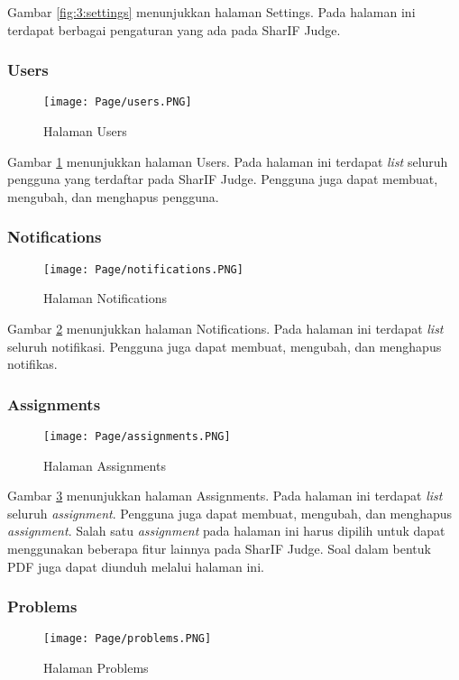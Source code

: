     Gambar \ref{fig:3:settings} menunjukkan halaman Settings. Pada halaman ini terdapat berbagai pengaturan yang ada pada SharIF Judge.
    
\subsubsection{Users}
    \begin{figure}[H]
    	\centering  
    	\texttt{[image: Page/users.PNG]}  
    	\caption{Halaman Users}
    	\label{fig:3:users} 
    \end{figure} 
    
    Gambar \ref{fig:3:users} menunjukkan halaman Users. Pada halaman ini terdapat \textit{list} seluruh pengguna yang terdaftar pada SharIF Judge. Pengguna juga dapat membuat, mengubah, dan menghapus pengguna.
    
\subsubsection{Notifications}
    \begin{figure}[H]
    	\centering  
    	\texttt{[image: Page/notifications.PNG]}  
    	\caption{Halaman Notifications}
    	\label{fig:3:notifications} 
    \end{figure} 
    
    Gambar \ref{fig:3:notifications} menunjukkan halaman Notifications. Pada halaman ini terdapat \textit{list} seluruh notifikasi. Pengguna juga dapat membuat, mengubah, dan menghapus notifikas.

\subsubsection{Assignments}
    \begin{figure}[H]
    	\centering  
    	\texttt{[image: Page/assignments.PNG]}  
    	\caption{Halaman Assignments}
    	\label{fig:3:assignments} 
    \end{figure} 
    
    Gambar \ref{fig:3:assignments} menunjukkan halaman Assignments. Pada halaman ini terdapat \textit{list} seluruh \textit{assignment}. Pengguna juga dapat membuat, mengubah, dan menghapus \textit{assignment}. Salah satu \textit{assignment} pada halaman ini harus dipilih untuk dapat menggunakan beberapa fitur lainnya pada SharIF Judge. Soal dalam bentuk PDF juga dapat diunduh melalui halaman ini. 
    
\subsubsection{Problems}
    \begin{figure}[H]
    	\centering  
    	\texttt{[image: Page/problems.PNG]}  
    	\caption{Halaman Problems}
    	\label{fig:3:problems} 
    \end{figure} 
    
